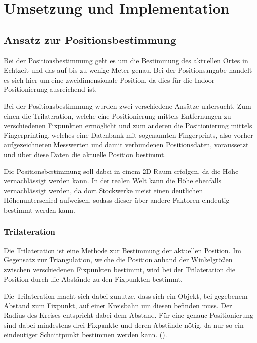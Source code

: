 \chapter{Umsetzung und Implementation}
\label{chap:implementation}

\section{Ansatz zur Positionsbestimmung}
\label{sec:implementation:positioning}
Bei der Positionsbestimmung geht es um die Bestimmung des aktuellen Ortes in Echtzeit und das auf bis zu wenige Meter genau. Bei der Positionsangabe handelt es sich hier um eine zweidimensionale Position, da dies für die Indoor-Positionierung ausreichend ist.

Bei der Positionsbestimmung wurden zwei verschiedene Ansätze untersucht. Zum einen die Trilateration, welche eine Positionierung mittels Entfernungen zu verschiedenen Fixpunkten ermöglicht und zum anderen die Positionierung mittels Fingerprinting, welches eine Datenbank mit sogenannten Fingerprints, also vorher aufgezeichneten Messwerten und damit verbundenen Positionsdaten, voraussetzt und über diese Daten die aktuelle Position bestimmt.

Die Positionsbestimmung soll dabei in einem 2D-Raum erfolgen, da die Höhe vernachlässigt werden kann. In der realen Welt kann die Höhe ebenfalls vernachlässigt werden, da dort Stockwerke meist einen deutlichen Höhenunterschied aufweisen, sodass dieser über andere Faktoren eindeutig bestimmt werden kann.

\subsection{Trilateration}
\label{sec:implementation:trilateration}
Die Trilateration ist eine Methode zur Bestimmung der aktuellen Position. Im Gegensatz zur Triangulation, welche die Position anhand der Winkelgrößen zwischen verschiedenen Fixpunkten bestimmt, wird bei der Trilateration die Position durch die Abstände zu den Fixpunkten bestimmt. 

Die Trilateration macht sich dabei zunutze, dass sich ein Objekt, bei gegebenem Abstand zum Fixpunkt, auf einer Kreisbahn um diesen befinden muss. Der Radius des Kreises entspricht dabei dem Abstand. Für eine genaue Positionierung sind dabei mindestens drei Fixpunkte und deren Abstände nötig, da nur so ein eindeutiger Schnittpunkt bestimmen werden kann. (\citet{wlanposlateration}).

